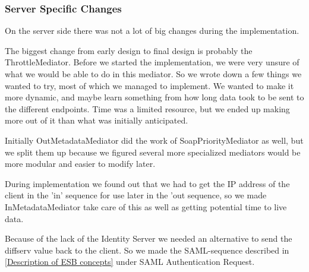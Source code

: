 \subsubsection{Server Specific Changes}\label{Changes:Server}
    On the server side there was not a lot of big changes during the implementation.
    
    The biggest change from early design to final design is probably the ThrottleMediator. Before we started the implementation, we were very unsure of what we would be able to do in this mediator. So we wrote down a few things we wanted to try, most of which we managed to implement. We wanted to make it more dynamic, and maybe learn something from how long data took to be sent to the different endpoints. Time was a limited resource, but we ended up making more out of it than what was initially anticipated.

    Initially OutMetadataMediator did the work of SoapPriorityMediator as well, but we split them up because we figured several more specialized mediators would be more modular and easier to modify later.

    During implementation we found out that we had to get the IP address of the client in the 'in' sequence for use later in the 'out sequence, so we made InMetadataMediator take care of this as well as getting potential time to live data.

    Because of the lack of the Identity Server we needed an alternative to send the diffserv value back to the client. So we made the SAML-sequence described in \ref{Description of ESB concepts} under SAML Authentication Request.